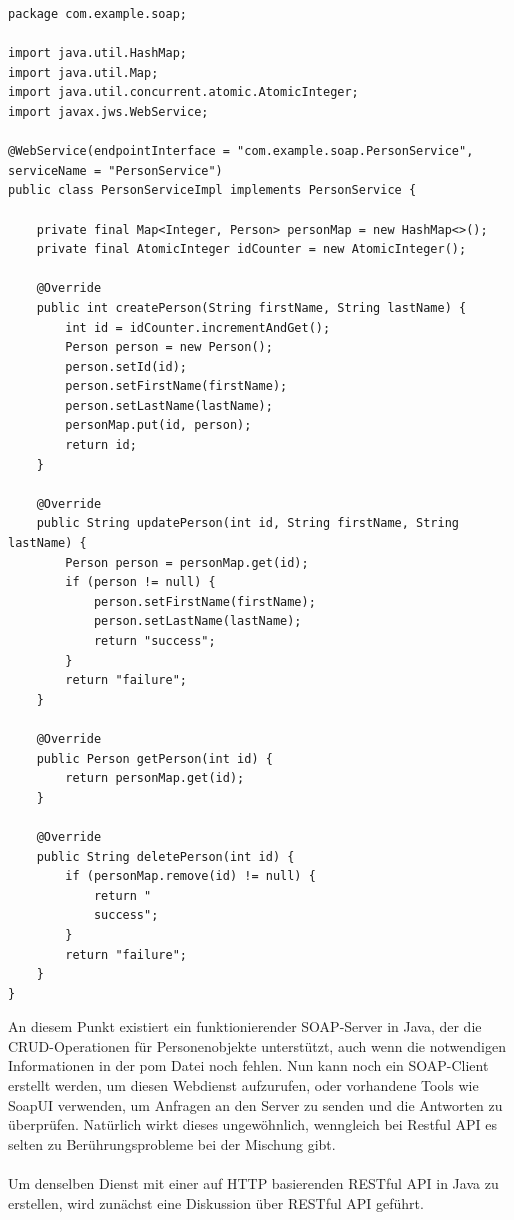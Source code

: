 \noindent\begin{minipage}{\textwidth}
\begin{lstlisting}[caption={SOAP Person Service Implementierung},captionpos=b,label={lst:soap_person_impl}]
package com.example.soap;

import java.util.HashMap;
import java.util.Map;
import java.util.concurrent.atomic.AtomicInteger;
import javax.jws.WebService;

@WebService(endpointInterface = "com.example.soap.PersonService", serviceName = "PersonService")
public class PersonServiceImpl implements PersonService {

    private final Map<Integer, Person> personMap = new HashMap<>();
    private final AtomicInteger idCounter = new AtomicInteger();

    @Override
    public int createPerson(String firstName, String lastName) {
        int id = idCounter.incrementAndGet();
        Person person = new Person();
        person.setId(id);
        person.setFirstName(firstName);
        person.setLastName(lastName);
        personMap.put(id, person);
        return id;
    }

    @Override
    public String updatePerson(int id, String firstName, String lastName) {
        Person person = personMap.get(id);
        if (person != null) {
            person.setFirstName(firstName);
            person.setLastName(lastName);
            return "success";
        }
        return "failure";
    }

    @Override
    public Person getPerson(int id) {
        return personMap.get(id);
    }

    @Override
    public String deletePerson(int id) {
        if (personMap.remove(id) != null) {
            return "
            success";
        }
        return "failure";
    }
}
\end{lstlisting}
\end{minipage}
An diesem Punkt existiert ein funktionierender SOAP-Server in Java, der die CRUD-Operationen für Personenobjekte unterstützt, auch wenn die notwendigen Informationen in der pom Datei noch fehlen. Nun kann noch ein SOAP-Client erstellt werden, um diesen Webdienst aufzurufen, oder vorhandene Tools wie SoapUI verwenden, um Anfragen an den Server zu senden und die Antworten zu überprüfen. Natürlich wirkt dieses ungewöhnlich, wenngleich bei Restful API es selten zu Berührungsprobleme bei der Mischung gibt. 
\\\\
Um denselben Dienst mit einer auf HTTP basierenden RESTful API in Java zu erstellen, wird zunächst eine Diskussion über RESTful API geführt. 

